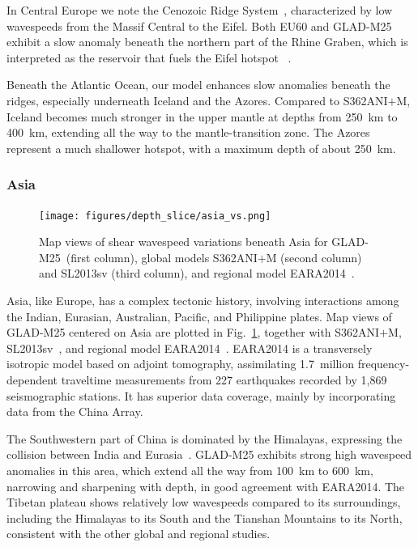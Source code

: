 \documentclass[extra,mreferee]{gji}
\begin{document}
In Central Europe we note the Cenozoic Ridge System~\citep{ziegler1992european},
characterized by low 
wavespeeds from the Massif Central to the Eifel. Both EU60 and
GLAD-M25 exhibit a slow anomaly beneath the northern part of the Rhine Graben,
which is interpreted as the reservoir that fuels the Eifel hotspot
~\citep{goes1999lower, zhu2015seismic}.

Beneath the Atlantic Ocean, our model enhances slow anomalies beneath the
ridges, especially underneath Iceland and the Azores.
Compared to S362ANI$+$M, Iceland becomes much stronger in the upper mantle at
depths from 250~km to 400~km, extending all the way to the mantle-transition zone.
The Azores represent a much shallower hotspot, with a maximum depth of about 250~km.

\subsubsection{Asia}

\begin{figure}[ht!]
  \texttt{[image: figures/depth\_slice/asia\_vs.png]}
  \caption{\small{Map views of shear wavespeed variations beneath Asia for GLAD-M25~(first column),
  global models S362ANI$+$M (second column) and SL2013sv (third column), and regional model EARA2014~\citep[last column;][]{chen2015multiparameter}.}}
  \label{fig:asia-vs}
  \centering
\end{figure}

Asia, like Europe, has a complex tectonic history, involving
interactions among the Indian, Eurasian, Australian, Pacific, and Philippine
plates.
Map views of GLAD-M25 centered on Asia are plotted in Fig.~\ref{fig:asia-vs},
together with S362ANI$+$M, SL2013sv~\citep{SchaefferLebedev13}, and regional model EARA2014~\citep{chen2015multiparameter}.
EARA2014 is a transversely isotropic model based on adjoint
tomography, assimilating 1.7~million frequency-dependent traveltime
measurements from 227 earthquakes recorded by 1,869 seismographic  stations.
It has superior data coverage, mainly by incorporating data from the China Array.

The Southwestern part of China is dominated by the Himalayas,
expressing the collision between India and Eurasia~\citep{lebedev2003upper}.
GLAD-M25 exhibits strong high wavespeed anomalies in this area,
which extend all the way from 100~km to 600~km, narrowing and sharpening with depth,
in good agreement with EARA2014.
The Tibetan plateau shows relatively low wavespeeds
compared to its surroundings, including the Himalayas to its South and
the Tianshan Mountains to its North, consistent with the other global
and regional studies.
\end{document}
